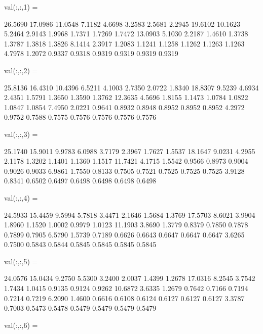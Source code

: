 \documentclass[a4paper,12pt]{ctexart}
\begin{document}
\begin{footnotesize}
\begin{lstlisting}[language=Mathematica]
\end{lstlisting}
val(:,:,1) =

   26.5690   17.0986   11.0548    7.1182    4.6698    3.2583    2.5681    2.2945
   19.6102   10.1623    5.2464    2.9143    1.9968    1.7371    1.7269    1.7472
   13.0903    5.1030    2.2187    1.4610    1.3738    1.3787    1.3818    1.3826
    8.1414    2.3917    1.2083    1.1241    1.1258    1.1262    1.1263    1.1263
    4.7978    1.2072    0.9337    0.9318    0.9319    0.9319    0.9319    0.9319


val(:,:,2) =

   25.8136   16.4310   10.4396    6.5211    4.1003    2.7350    2.0722    1.8340
   18.8307    9.5239    4.6934    2.4351    1.5791    1.3650    1.3590    1.3762
   12.3635    4.5696    1.8155    1.1473    1.0784    1.0822    1.0847    1.0854
    7.4950    2.0221    0.9641    0.8932    0.8948    0.8952    0.8952    0.8952
    4.2972    0.9752    0.7588    0.7575    0.7576    0.7576    0.7576    0.7576


val(:,:,3) =

   25.1740   15.9011    9.9783    6.0988    3.7179    2.3967    1.7627    1.5537
   18.1647    9.0231    4.2955    2.1178    1.3202    1.1401    1.1360    1.1517
   11.7421    4.1715    1.5542    0.9566    0.8973    0.9004    0.9026    0.9033
    6.9861    1.7550    0.8133    0.7505    0.7521    0.7525    0.7525    0.7525
    3.9128    0.8341    0.6502    0.6497    0.6498    0.6498    0.6498    0.6498


val(:,:,4) =

   24.5933   15.4459    9.5994    5.7818    3.4471    2.1646    1.5684    1.3769
   17.5703    8.6021    3.9904    1.8960    1.1520    1.0002    0.9979    1.0123
   11.1903    3.8690    1.3779    0.8379    0.7850    0.7878    0.7899    0.7905
    6.5790    1.5739    0.7189    0.6626    0.6643    0.6647    0.6647    0.6647
    3.6265    0.7500    0.5843    0.5844    0.5845    0.5845    0.5845    0.5845


val(:,:,5) =

   24.0576   15.0434    9.2750    5.5300    3.2400    2.0037    1.4399    1.2678
   17.0316    8.2545    3.7542    1.7434    1.0415    0.9135    0.9124    0.9262
   10.6872    3.6335    1.2679    0.7642    0.7166    0.7194    0.7214    0.7219
    6.2090    1.4600    0.6616    0.6108    0.6124    0.6127    0.6127    0.6127
    3.3787    0.7003    0.5473    0.5478    0.5479    0.5479    0.5479    0.5479


val(:,:,6) =


\end{footnotesize}
\end{document}
